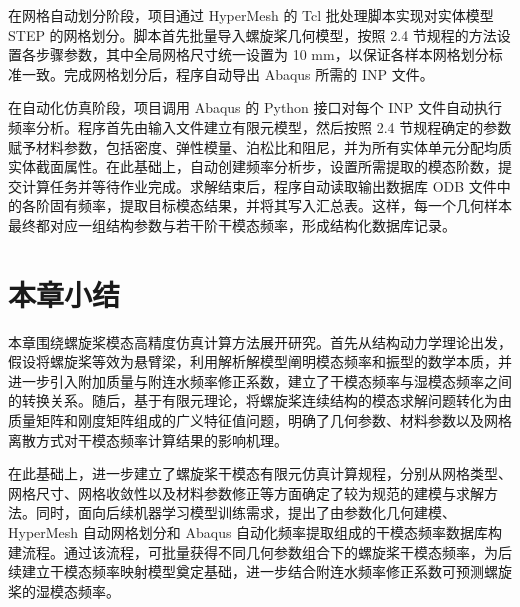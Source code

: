 在网格自动划分阶段，项目通过 HyperMesh 的 Tcl 批处理脚本实现对实体模型 STEP 的网格划分。脚本首先批量导入螺旋桨几何模型，按照 2.4 节规程的方法设置各步骤参数，其中全局网格尺寸统一设置为 10 mm，以保证各样本网格划分标准一致。完成网格划分后，程序自动导出 Abaqus 所需的 INP 文件。

在自动化仿真阶段，项目调用 Abaqus 的 Python 接口对每个 INP 文件自动执行频率分析。程序首先由输入文件建立有限元模型，然后按照 2.4 节规程确定的参数赋予材料参数，包括密度、弹性模量、泊松比和阻尼，并为所有实体单元分配均质实体截面属性。在此基础上，自动创建频率分析步，设置所需提取的模态阶数，提交计算任务并等待作业完成。求解结束后，程序自动读取输出数据库 ODB 文件中的各阶固有频率，提取目标模态结果，并将其写入汇总表。这样，每一个几何样本最终都对应一组结构参数与若干阶干模态频率，形成结构化数据库记录。

\section{本章小结}

本章围绕螺旋桨模态高精度仿真计算方法展开研究。首先从结构动力学理论出发，假设将螺旋桨等效为悬臂梁，利用解析解模型阐明模态频率和振型的数学本质，并进一步引入附加质量与附连水频率修正系数，建立了干模态频率与湿模态频率之间的转换关系。随后，基于有限元理论，将螺旋桨连续结构的模态求解问题转化为由质量矩阵和刚度矩阵组成的广义特征值问题，明确了几何参数、材料参数以及网格离散方式对干模态频率计算结果的影响机理。

在此基础上，进一步建立了螺旋桨干模态有限元仿真计算规程，分别从网格类型、网格尺寸、网格收敛性以及材料参数修正等方面确定了较为规范的建模与求解方法。同时，面向后续机器学习模型训练需求，提出了由参数化几何建模、HyperMesh 自动网格划分和 Abaqus 自动化频率提取组成的干模态频率数据库构建流程。通过该流程，可批量获得不同几何参数组合下的螺旋桨干模态频率，为后续建立干模态频率映射模型奠定基础，进一步结合附连水频率修正系数可预测螺旋桨的湿模态频率。
